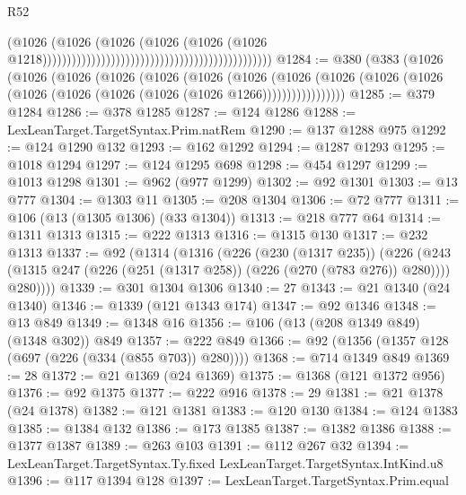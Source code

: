 \begin{lexlean}{R52}
\begin{coremodule}
                                                                                      (@1026
                                                                                        (@1026
                                                                                          (@1026
                                                                                            (@1026
                                                                                              (@1026
                                                                                                (@1026
                                                                                                  @1218)))))))))))))))))))))))))))))))))))))))))))))))
@1284 := @380
    (@383
      (@1026
        (@1026
          (@1026
            (@1026
              (@1026
                (@1026
                  (@1026
                    (@1026
                      (@1026 (@1026 (@1026 (@1026 (@1026 (@1026 (@1026 (@1026 @1266)))))))))))))))))
@1285 := @379 @1284
@1286 := @378 @1285
@1287 := @124 @1286
@1288 := LexLeanTarget.TargetSyntax.Prim.natRem
@1290 := @137 @1288 @975
@1292 := @124 @1290 @132
@1293 := @162 @1292
@1294 := @1287 @1293
@1295 := @1018 @1294
@1297 := @124 @1295 @698
@1298 := @454 @1297
@1299 := @1013 @1298
@1301 := @962 (@977 @1299)
@1302 := @92 @1301
@1303 := @13 @777
@1304 := @1303 @11
@1305 := @208 @1304
@1306 := @72 @777
@1311 := @106 (@13 (@1305 @1306) (@33 @1304))
@1313 := @218 @777 @64
@1314 := @1311 @1313
@1315 := @222 @1313
@1316 := @1315 @130
@1317 := @232 @1313
@1337 := @92
    (@1314
      (@1316
        (@226
          (@230 (@1317 @235))
          (@226
            (@243 (@1315 @247 (@226 (@251 (@1317 @258)) (@226 (@270 (@783 @276)) @280))))
            @280))))
@1339 := @301 @1304 @1306
@1340 := 27
@1343 := @21 @1340 (@24 @1340)
@1346 := @1339 (@121 @1343 @174)
@1347 := @92 @1346
@1348 := @13 @849
@1349 := @1348 @16
@1356 := @106 (@13 (@208 @1349 @849) (@1348 @302)) @849
@1357 := @222 @849
@1366 := @92 (@1356 (@1357 @128 (@697 (@226 (@334 (@855 @703)) @280))))
@1368 := @714 @1349 @849
@1369 := 28
@1372 := @21 @1369 (@24 @1369)
@1375 := @1368 (@121 @1372 @956)
@1376 := @92 @1375
@1377 := @222 @916
@1378 := 29
@1381 := @21 @1378 (@24 @1378)
@1382 := @121 @1381
@1383 := @120 @130
@1384 := @124 @1383
@1385 := @1384 @132
@1386 := @173 @1385
@1387 := @1382 @1386
@1388 := @1377 @1387
@1389 := @263 @103
@1391 := @112 @267 @32
@1394 := LexLeanTarget.TargetSyntax.Ty.fixed LexLeanTarget.TargetSyntax.IntKind.u8
@1396 := @117 @1394 @128
@1397 := LexLeanTarget.TargetSyntax.Prim.equal

\end{coremodule}
\end{lexlean}
